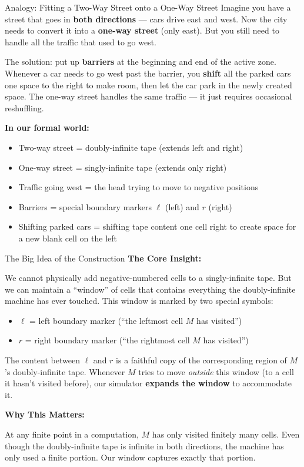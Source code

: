 \begin{notebox}{Analogy: Fitting a Two-Way Street onto a One-Way Street}
Imagine you have a street that goes in \textbf{both directions} --- cars drive
east and west. Now the city needs to convert it into a \textbf{one-way street}
(only east). But you still need to handle all the traffic that used to go
west.

The solution: put up \textbf{barriers} at the beginning and end of the active
zone. Whenever a car needs to go west past the barrier, you \textbf{shift} all
the parked cars one space to the right to make room, then let the car park in
the newly created space. The one-way street handles the same traffic --- it
just requires occasional reshuffling.

\textbf{In our formal world:}
\begin{itemize}[nosep]
\item Two-way street = doubly-infinite tape (extends left and right)
\item One-way street = singly-infinite tape (extends only right)
\item Traffic going west = the head trying to move to negative positions
\item Barriers = special boundary markers $\ell$ (left) and $r$ (right)
\item Shifting parked cars = shifting tape content one cell right to create
  space for a new blank cell on the left
\end{itemize}
\end{notebox}

\begin{conceptbox}{The Big Idea of the Construction}
\textbf{The Core Insight:}

We cannot physically add negative-numbered cells to a singly-infinite tape.
But we can maintain a ``window'' of cells that contains everything the
doubly-infinite machine has ever touched. This window is marked by two special
symbols:
\begin{itemize}[nosep]
\item $\ell$ = left boundary marker (``the leftmost cell $M$ has visited'')
\item $r$ = right boundary marker (``the rightmost cell $M$ has visited'')
\end{itemize}

The content between $\ell$ and $r$ is a faithful copy of the corresponding
region of $M$'s doubly-infinite tape. Whenever $M$ tries to move \emph{outside}
this window (to a cell it hasn't visited before), our simulator \textbf{expands
the window} to accommodate it.

\textbf{Why This Matters:}

At any finite point in a computation, $M$ has only visited finitely many cells.
Even though the doubly-infinite tape is infinite in both directions, the
machine has only used a finite portion. Our window captures exactly that
portion.

\end{conceptbox}

